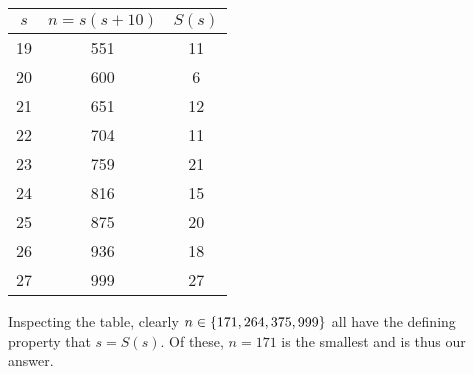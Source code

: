 \documentclass{article}
\begin{document}
{\begin{multicols}{3}
    \begin{center}
      \begin{tabular}{c|cc}
        $s$ & $n = s(s + 10)$ & $S(s)$ \\
        \hline
        19  & 551             & 11     \\
        20  & 600             & 6      \\
        21  & 651             & 12     \\
        22  & 704             & 11     \\
        23  & 759             & 21     \\
        24  & 816             & 15     \\
        25  & 875             & 20     \\
        26  & 936             & 18     \\
        27  & 999             & 27     \\
      \end{tabular}
    \end{center}
  \end{multicols}
  Inspecting the table, clearly $n \in \left\{ 171, 264, 375, 999 \right\}$ all have the defining property that $s = S(s)$.
  Of these, $n = 171$ is the smallest and is thus our answer.
}
\end{document}
